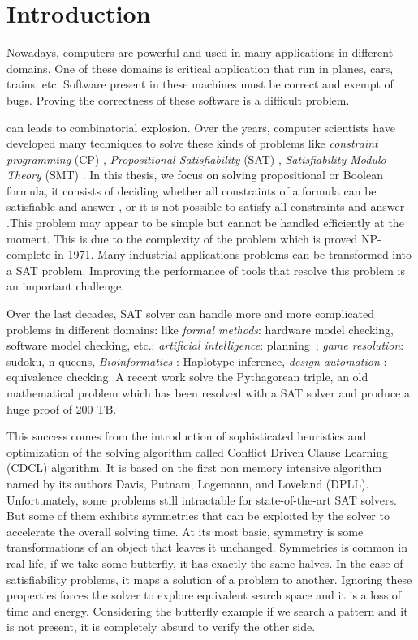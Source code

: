 \chapter{Introduction}\label{chap:intro}

Nowadays, computers are powerful and used in many applications in different domains.
One of these domains is critical application that run in planes, cars, trains, etc.
Software present in these machines must be correct and exempt of bugs.
Proving the correctness of these software is a difficult problem. 



 can leads to combinatorial explosion.
Over the years, computer scientists have developed many techniques to solve 
these kinds of problems like \emph{constraint programming} (CP) \cite{rossi2006handbook},
\emph{Propositional Satisfiability} (SAT) \cite{biere2009handbook},
\emph{Satisfiability Modulo Theory} (SMT) \cite{barrett2018satisfiability}.
In this thesis, we focus on solving propositional or Boolean formula, it consists of deciding whether 
all constraints of a formula can be satisfiable and answer \sat, or it is not possible to satisfy all
constraints and answer \unsat.This problem may appear to be simple but cannot be handled efficiently
at the moment. This is due to the complexity of the problem which is proved NP-complete in 1971. 
Many industrial applications problems can be transformed into a SAT problem.
Improving the performance of tools that resolve this problem is an important challenge. 

Over the last decades, SAT solver can handle more and more complicated problems in different domains:
like \emph{formal methods}: hardware model checking,
software model checking, etc.; \emph{artificial intelligence}: planning~\cite{planning_92}; \emph{game resolution}:
sudoku, n-queens, \emph{Bioinformatics} : Haplotype inference,
\emph{design automation} : equivalence checking.
A recent work solve the Pythagorean triple, an old mathematical problem which has been resolved with 
a SAT solver and produce a huge proof of 200 TB.
 
This success comes from the introduction of sophisticated heuristics and optimization of the solving 
algorithm called Conflict Driven Clause Learning (CDCL) algorithm. It is based on the first non memory
intensive algorithm named by its authors Davis, Putnam, Logemann, and Loveland (DPLL).
Unfortunately, some problems still intractable for state-of-the-art SAT solvers. But some 
of them exhibits symmetries that can be exploited by the solver to accelerate the overall solving time.
At its most basic, symmetry is some transformations of an object that leaves it unchanged.
Symmetries is common in real life, if we take some butterfly, it has exactly the same halves.
In the case of satisfiability problems, it maps a solution of a problem to another.
Ignoring these properties forces the solver to explore equivalent search space and it is a loss of
time and energy. Considering the butterfly example if we search a pattern and it is not present, it is
completely absurd to verify the other side. 

